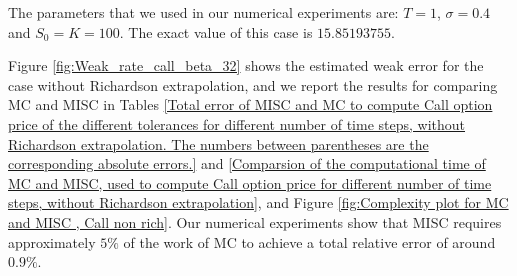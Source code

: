 The parameters that we used in our numerical experiments are: $T=1$, $\sigma=0.4$ and $S_0=K=100$. The exact value of this case is $15.85193755$.

Figure \ref{fig:Weak_rate_call_beta_32} shows the estimated   weak error  for the case without Richardson extrapolation, and we report the results for comparing MC and MISC in Tables \ref{Total error of MISC and MC to compute Call option price of the different tolerances for different number of time steps, without Richardson extrapolation. The numbers between parentheses are the corresponding absolute errors.} and \ref{Comparsion of the computational time of  MC and MISC, used to compute Call option price  for different number of time steps, without Richardson extrapolation}, and Figure \ref{fig:Complexity plot for MC and MISC , Call non rich}. Our numerical experiments show that MISC  requires approximately $5\%$ of the work of MC  to achieve a total relative error of around $0.9\%$.




